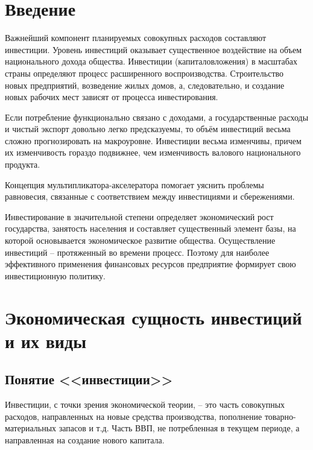 \chapter*{Введение}

Важнейший компонент планируемых совокупных расходов составляют инвестиции.
Уровень инвестиций оказывает существенное воздействие на объем национального
дохода общества. Инвестиции (капиталовложения) в масштабах страны определяют
процесс расширенного воспроизводства. Строительство новых предприятий,
возведение жилых домов, а, следовательно, и создание новых рабочих мест зависят
от процесса инвестирования.

Если потребление функционально связано с доходами, а государственные расходы и
чистый экспорт довольно легко предсказуемы, то объём инвестиций весьма сложно
прогнозировать на макроуровне. Инвестиции весьма изменчивы, причем их
изменчивость гораздо подвижнее, чем изменчивость валового национального
продукта.

Концепция мультипликатора-акселератора помогает уяснить проблемы равновесия,
связанные с соответствием между инвестициями и сбережениями.

Инвестирование в значительной степени определяет экономический рост
государства, занятость населения и составляет существенный элемент базы, на
которой основывается экономическое развитие общества. Осуществление инвестиций
-- протяженный во времени процесс. Поэтому для наиболее эффективного применения
финансовых ресурсов предприятие формирует свою инвестиционную политику.

\pagebreak %

\chapter{Экономическая сущность инвестиций и их виды}

\vspace*{2em}
\section{Понятие <<инвестиции>>}

Инвестиции, с точки зрения экономической теории, -- это часть совокупных
расходов, направленных на новые средства производства, пополнение
товарно-материальных запасов и т.д. Часть ВВП, не потребленная в текущем
периоде, а направленная на создание нового капитала.

